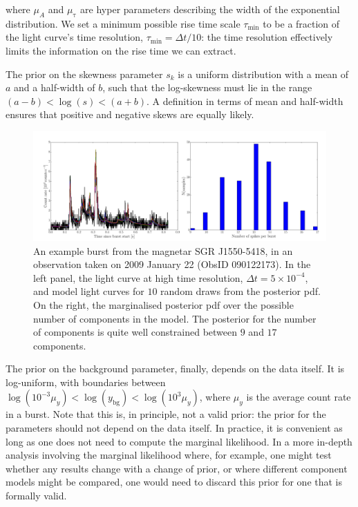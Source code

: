\documentclass[12pt]{emulateapj}
\newcommand{\counts}{y}
\begin{document}
where $\mu_A$ and $\mu_{\mathrm{\tau}}$ are hyper parameters describing the width of the exponential distribution.
We set a minimum possible rise time scale $\tau_{\mathrm{min}}$ to be a fraction of the light curve's time resolution,
$\tau_{\mathrm{min}} = \Delta t/10$: the time resolution effectively limits the information on the rise time we can extract.

The prior on the skewness parameter $s_k$ is a uniform distribution with a mean of $a$ and a half-width of $b$, such
that the log-skewness must lie in the range $(a-b) < \log{(s)} < (a+b)$. A definition in terms of mean and half-width ensures
that positive and negative skews are equally likely.

\begin{figure}[h]
\begin{center}
\includegraphics[width=\textwidth]{example_dnest_result.pdf}
\caption{An example burst from the magnetar SGR J1550-5418, in an observation taken on 2009 January 22 (ObsID 090122173). In the left
panel, the light curve at high time resolution, $\Delta t = 5 \times 10^{-4}$, and model light curves for $10$ random draws from the posterior pdf. 
On the right, the marginalised posterior pdf over the possible number of components in the model. The posterior for the number of components is 
quite well constrained between $9$ and $17$ components.}
\label{fig:dnest_example}
\end{center}
\end{figure}

The prior on the background parameter, finally, depends on the data itself. It is log-uniform, with boundaries between 
$\log{(10^{-3}\mu_\counts)} < \log{(\counts_{\mathrm{bg}})} < \log{(10^{3} \mu_\counts)}$, where $\mu_\counts$ is the average count
rate in a burst. Note that this is, in principle, not a valid prior: the prior for the parameters should not depend on the data
itself. In practice, it is convenient as long as one does not need to compute the marginal likelihood. In a more in-depth analysis
involving the marginal likelihood where, for example, one might test whether any results change with a change of prior, or where different component models
might be compared, one would need to discard this prior for one that is formally valid.
\end{document}

